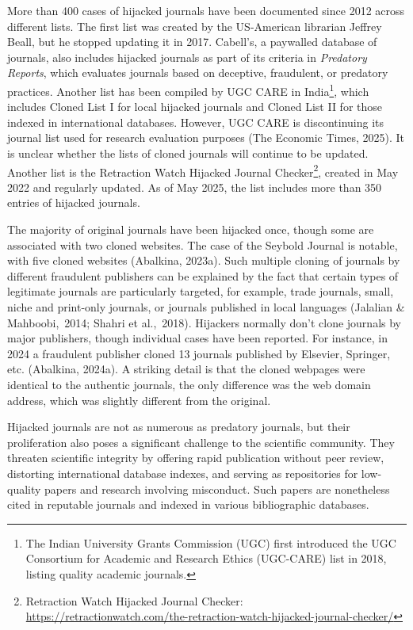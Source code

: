 \documentclass[a4paper,
fontsize=11pt,
oneside,
numbers=noperiodatend,
parskip=half-,
bibliography=totoc,
final
]{scrartcl}
\begin{document}
More than 400 cases of hijacked journals have been documented since 2012
across different lists. The first list was created by the US-American
librarian Jeffrey Beall, but he stopped updating it in 2017. Cabell's, a
paywalled database of journals, also includes hijacked journals as part
of its criteria in \emph{Predatory Reports}, which evaluates journals
based on deceptive, fraudulent, or predatory practices. Another list has
been compiled by UGC CARE in India\footnote{The Indian University Grants
  Commission (UGC) first introduced the UGC Consortium for Academic and
  Research Ethics (UGC-CARE) list in 2018, listing quality academic
  journals.}, which includes Cloned List I for local hijacked journals
and Cloned List II for those indexed in international databases.
However, UGC CARE is discontinuing its journal list used for research
evaluation purposes (The Economic Times, 2025). It is unclear whether
the lists of cloned journals will continue to be updated. Another list
is the Retraction Watch Hijacked Journal Checker\footnote{Retraction
  Watch Hijacked Journal Checker:
  \url{https://retractionwatch.com/the-retraction-watch-hijacked-journal-checker/}},
created in May 2022 and regularly updated. As of May 2025, the list
includes more than 350 entries of hijacked journals.

The majority of original journals have been hijacked once, though some
are associated with two cloned websites. The case of the Seybold Journal
is notable, with five cloned websites (Abalkina, 2023a). Such multiple
cloning of journals by different fraudulent publishers can be explained
by the fact that certain types of legitimate journals are particularly
targeted, for example, trade journals, small, niche and print-only
journals, or journals published in local languages (Jalalian \&
Mahboobi,~2014; Shahri et al.,~2018). Hijackers normally don't clone
journals by major publishers, though individual cases have been
reported. For instance, in 2024 a fraudulent publisher cloned 13
journals published by Elsevier, Springer, etc. (Abalkina, 2024a). A
striking detail is that the cloned webpages were identical to the
authentic journals, the only difference was the web domain address,
which was slightly different from the original.

Hijacked journals are not as numerous as predatory journals, but their
proliferation also poses a significant challenge to the scientific
community. They threaten scientific integrity by offering rapid
publication without peer review, distorting international database
indexes, and serving as repositories for low-quality papers and research
involving misconduct. Such papers are nonetheless cited in reputable
journals and indexed in various bibliographic databases.
\end{document}
